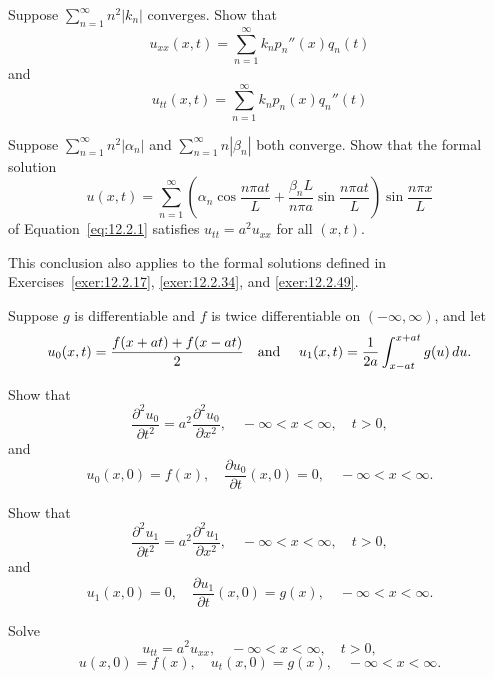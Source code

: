 \begin{exerciselist}
\begin{alist}
    \item %
    Suppose $\sum_{n=1}^{\infty}n^{2}|k_{n}|$ converges. Show that
    \[
      u_{xx}(x,t)= \sum_{n=1}^{\infty}k_{n}p_{n}''(x)q_{n}(t)
    \]
    and
    \[
      u_{tt}(x,t)= \sum_{n=1}^{\infty}k_{n}p_{n}(x)q_{n}''(t)
    \]

    \item %
    Suppose $\sum_{n=1}^{\infty}n^{2}|\alpha_{n}|$ and $\sum_{n=1}^{\infty}n|\beta_{n}|$ both
    converge. Show that the formal solution
    \[
      u(x,t)=\sum_{n=1}^{\infty}\left(\alpha_{n}\cos\frac{n\pi at}{L}+\frac{\beta_{n}L}{n\pi a}\sin\frac{n\pi at}{L}\right) \sin\frac{n\pi x}{L}
    \]
    of Equation~\ref{eq:12.2.1} satisfies $u_{tt}=a^{2}u_{xx}$ for all $(x,t)$.

    This conclusion also applies to the formal solutions defined in Exercises~\ref{exer:12.2.17},
    \ref{exer:12.2.34}, and \ref{exer:12.2.49}.
  \end{alist}

  \item\label{exer:12.2.63} Suppose $g$ is differentiable and $f$ is twice differentiable on
        $(-\infty,\infty)$, and let
  \[
    u_{0}(x,t)=\frac{f(x+at)+f(x-at)}{2}\mbox{\quad and \quad}u_{1}(x,t)=\frac{1}{2a}\int_{x-at}^{x+at}g(u)\,du.
  \]
  \begin{alist}
    \item %
    Show that
    \[
      \frac{\partial^{2}u_{0}}{\partial t^{2}}=a^{2}\frac{\partial^{2}u_{0}}{\partial x^{2}},\quad-\infty<x<\infty,\quad t>0,
    \]
    and
    \[
      u_{0}(x,0)=f(x),\quad\frac{\partial u_{0}}{\partial t}(x,0)=0,\quad -\infty<x<\infty.
    \]

    \item %
    Show that
    \[
      \frac{\partial^{2}u_{1}}{\partial t^{2}}=a^{2}\frac{\partial^{2}u_{1}}{\partial x^{2}},\quad-\infty<x<\infty,\quad t>0,
    \]
    and
    \[
      u_{1}(x,0)=0,\quad\frac{\partial u_{1}}{\partial t}(x,0)=g(x),\quad -\infty<x<\infty.
    \]

    \item %
    Solve
    \[
      u_{tt}=a^{2}u_{xx},\quad-\infty<x<\infty,\quad t>0,
    \]
    \[
      u(x,0)=f(x),\quad u_{t}(x,0)=g(x),\quad-\infty<x<\infty.
    \]
  \end{alist}



\end{exerciselist}
